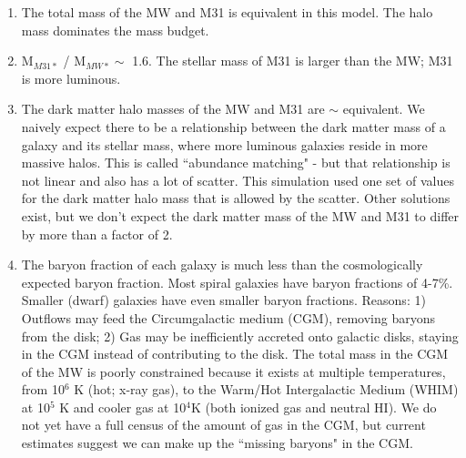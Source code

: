 \documentclass[12pt]{article}
\begin{document}
\begin{enumerate}

\item  The total mass of the MW and M31 is equivalent in this model.  The halo mass dominates the mass budget. 

\item  M$_{M31\ast}$ / M$_{MW\ast} \sim$ 1.6. The stellar mass of M31 is larger than the MW; M31 is more luminous.

\item  The dark matter halo masses of the MW and M31 are $\sim$ equivalent.  We naively expect there to be a relationship between the dark matter mass of a galaxy and its stellar mass, where more luminous galaxies reside in more massive halos. This is called ``abundance matching"  - but that relationship is not linear and also has a lot of scatter. This simulation used one set of values for the dark matter halo mass that is allowed by the scatter.  Other solutions exist, but we don't expect the dark matter mass of the MW and M31 to differ by more than a factor of 2.

\item The baryon fraction of each galaxy is much less than the cosmologically expected baryon fraction. Most spiral galaxies have baryon fractions of 4-7\%. 
Smaller (dwarf) galaxies have even smaller baryon fractions. 
  Reasons: 1) Outflows may feed the
Circumgalactic medium (CGM), removing baryons from the disk;  2) Gas may be inefficiently accreted onto galactic disks, staying in the CGM instead of 
contributing to the disk.  The total mass in the CGM of the MW is poorly constrained because it exists at multiple temperatures, from 10$^6$ K (hot; x-ray gas), to 
the Warm/Hot Intergalactic Medium (WHIM) at 10$^5$ K and cooler gas at 10$^4 $K (both ionized gas and neutral HI).  We do not yet have a full census of the 
amount of gas in the CGM, but current estimates suggest we can make up the ``missing baryons" in the CGM.  
 


\end{enumerate}
\end{document}
